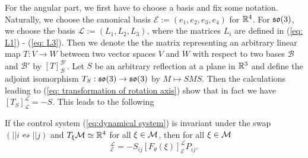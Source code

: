 For the angular part, we first have to choose a basis and fix some notation. Naturally, we choose the canonical basis $\mathcal{E} := (e_1, e_2, e_3, e_4)$ for $\mathbb{R}^4$. For $\mathfrak{so}(3)$, we choose the basis $\mathcal{L} := (L_1, L_2, L_3)$, where the matrices $L_i$ are defined in (\ref{eq: L1}) - (\ref{eq: L3}). Then we denote the the matrix representing an arbitrary linear map $T: V \to W$ between two vector spaces $V$ and $W$ with respect to two bases $\mathcal{B}$ and $\mathcal{B}'$ by $[T]_{\mathcal{B}}^{\mathcal{B}'}$. Let $S$ be an arbitrary reflection at a plane in $\mathbb{R}^3$ and define the adjoint isomorphism $T_S: \mathfrak{so}(3) \to \mathfrak{so}(3)$ by $M \mapsto S MS$. Then the calculations leading to (\ref{eq: transformation of rotation axis}) show that in fact we have $[T_S]_{\mathcal{L}}^{\mathcal{L}} = -S$. This leads to the following 

\begin{proposition}
\label{prop: angular permutation invariance}
If the control system (\ref{eq:dynamical system}) is invariant under the swap $(||i \leftrightsquigarrow ||j)$ and $T_{\xi}\mathcal{M} \simeq \mathbb{R}^4$ for all $\xi \in \mathcal{M}$, then for all $\xi \in \mathcal{M}$
\begin{equation}
[F_{\theta}(P_{ij} \xi)]_{\mathcal{E}}^{\mathcal{L}} = - S_{ij} [F_{\theta}(\xi)]_{\mathcal{E}}^{\mathcal{L}} P_{ij}.
\end{equation}
\end{proposition}

